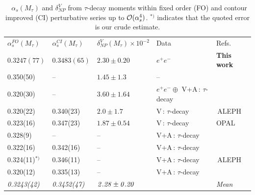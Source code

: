 \documentclass[review]{elsarticle}
\begin{document}
   {\footnotesize
\begin{table}[hbt]
\setlength{\tabcolsep}{1.1pc}
  \begin{center}
    {%
  \begin{tabular}{lllll}

&\\
\hline
\hline
$\alpha_s ^{FO}(M_\tau)$&$\alpha_s ^{CI}(M_\tau)$&$\delta^V_{NP}(M_\tau)\times 10^{-2}$  &Data& Refs.\\
 \hline 
\boldmath$0.3247(77)$&\boldmath$0.3483(65)$&\boldmath$2.30\pm 0.20$&\boldmath$e^+e^-$&{\bf This work}\\
0.350(50)&--&$1.45\pm 1.3$ &--& \cite{SNPICH} \\
0.320(30)&--& $3.60\pm 1.64$&  $e^+e^-\oplus$ V+A\,: $\tau$-decay & \cite{SN95}\\
0.320(22)&0.340(23)&$2.0\pm1.7$&V\,: $\tau$-decay&\,{\rm ALEPH}\,\cite{ALEPH}\\
0.323(16)&0.347(23)&$1.87\pm 0.54$&V\,: $\tau$-decay&{\rm OPAL}\,\cite{OPAL}\\
0.328(9)&--&--& V+A\,:  $\tau$-decay & \cite{SNTAU}\\
0.322(16)&0.342(16)&-- &V+A\,: $\tau$-decay&\cite{CHET4}\\
0.324(11)$^{*)}$&0.346(11) &--&V+A\,: $\tau$-decay&\,{\rm ALEPH}\,\cite{DAVIER}\\
0.320(12)&0.335(13)&--&V+A\,: $\tau$-decay&\cite{PICH2}\\
\hline
\it  0.3243(42) &\it 0.3452(47)&$\it 2.28\pm 0.20$&& \it Mean \\
   \hline\hline
\end{tabular}}
 \caption{ ~$\alpha_s(M_\tau)$ and $\delta^V_{NP}$ from $\tau$-decay moments within fixed order (FO) and contour improved (CI) perturbative series up to ${\cal O}(\alpha_s^4)$. $^{*)}$ indicates that the quoted error is our crude estimate. }\label{tab:alpha_s} 
 \end{center}
\end{table}
} 
\end{document}
